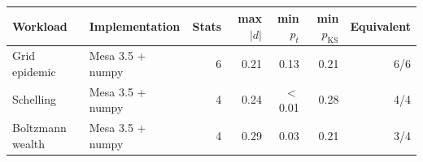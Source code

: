 \begin{tabular}{llrrrrr}
\toprule
Workload & Implementation & Stats & max $|d|$ & min $p_{t}$ & min $p_{\mathrm{KS}}$ & Equivalent \\
\midrule
Grid epidemic & Mesa 3.5 + numpy & 6 & 0.21 & 0.13 & 0.21 & 6/6 \\
Schelling & Mesa 3.5 + numpy & 4 & 0.24 & $<$0.01 & 0.28 & 4/4 \\
Boltzmann wealth & Mesa 3.5 + numpy & 4 & 0.29 & 0.03 & 0.21 & 3/4 \\
\bottomrule
\end{tabular}
